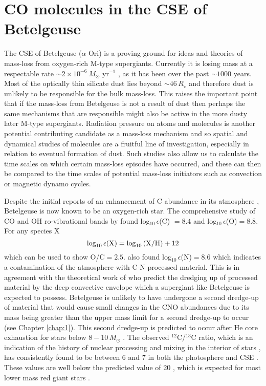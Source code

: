 \section{CO molecules in the CSE of Betelgeuse}
\label{sec:5.1}
The CSE of Betelgeuse ($\alpha$ Ori) is a proving ground for ideas and theories of mass-loss from oxygen-rich M-type supergiants. Currently it is losing mass at a respectable rate $\sim 2\times 10^{-6} \ M_{\odot}$ yr${}^{-1}$ \citep{harper_2001}, as it has been over the past $\sim 1000$ years. Most of the optically thin silicate dust lies beyond $\sim 46\,R_{\star}$ \citep{danchi_1994} and therefore dust is unlikely to be responsible for the bulk mass-loss. This raises the important point that if the mass-loss from Betelgeuse is not a result of dust then perhaps the same mechanisms that are responsible might also be active in the more dusty later M-type supergiants. Radiation pressure on atoms and molecules is another potential contributing candidate as a mass-loss mechanism and so spatial and dynamical studies of molecules are a fruitful line of investigation, especially in relation to eventual formation of dust. Such studies also allow us to calculate the time scales on which certain mass-loss episodes have occurred, and these can then be compared to the time scales of potential mass-loss initiators such as convection or magnetic dynamo cycles.

Despite the initial reports of an enhancement of C abundance in its atmosphere \citep{spinrad_1966}, Betelgeuse is now known to be an oxygen-rich star. The comprehensive study of CO and OH ro-vibrational bands by \cite{lambert_1984} found log$_{10}$\,$\epsilon$(C) $ = 8.4$ and log$_{10}$\,$\epsilon$(O)$ = 8.8$. For any species X
\begin{equation}
\rm{log}_{10}\,\epsilon(X)=\rm{log}_{10}\,(X/H)+12
\end{equation}
which can be used to show O/C$ = 2.5$. \cite{lambert_1984} also found log$_{10}$\,$\epsilon$(N)$ = 8.6$ which indicates a contamination of the atmosphere with C-N processed material. This is in agreement with the theoretical work of \cite{lamb_1976} who predict the dredging up of processed material by the deep convective envelope which a supergiant like Betelgeuse is expected to possess. Betelgeuse is unlikely to have undergone a second dredge-up of material that would cause small changes in the CNO abundances due to its mass being greater than the upper mass limit for a second dredge-up to occur (see Chapter \ref{chap:1}). This second dredge-up is predicted to occur after He core exhaustion for stars below $8-10 \,M_{\odot}$ \citep{kaler_1978}. The observed $^{12}$C/$^{13}$C ratio, which is an indication of the history of nuclear processing and mixing in the interior of stars \citep{pavlenko_2003,eggleton_2007}, has consistently found to be between 6 and 7 in both the photosphere and CSE \citep{lambert_1974,hinkle_1976,bernat_1979,harris_1984}. These values are well below the predicted value of 20 \citep{charbonnel_1995,pavlenko_2003}, which is expected for most lower mass red giant stars \citep[e.g.,][]{boothroyd_1999}.

